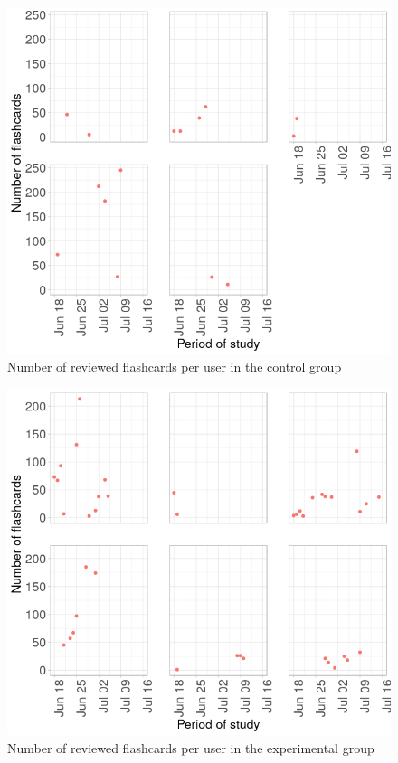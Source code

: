 \begin{figure}[htb]
    \vskip 5mm
        \begin{center}
            \includegraphics[scale=0.7]{./Figures/con_n_flashcards.png}
            \caption{Number of reviewed flashcards per user in the control group}
            \label{fig:cards-control}
        \end{center}
    \vskip -5mm
\end{figure}

\begin{figure}[htb]
    \vskip 5mm
        \begin{center}
            \includegraphics[scale=0.7]{./Figures/exp_n_flashcards.png}
            \caption{Number of reviewed flashcards per user in the experimental group}
            \label{fig:cards-experimental}
        \end{center}
    \vskip -5mm
\end{figure}

